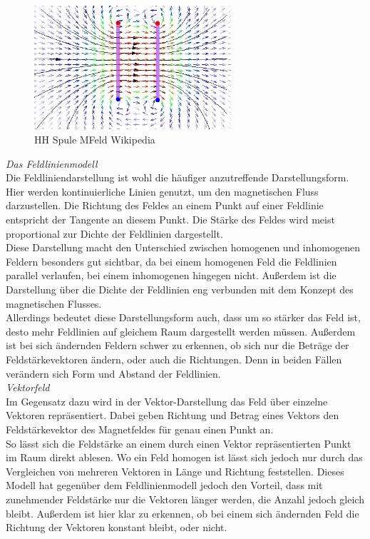 \begin{figure}[h!]
	\centering
	\includegraphics[width=0.65\textwidth]{images/Magnetfeld-Helmholtzspule.jpg}
	\caption{HH Spule MFeld Wikipedia}
	\label{img:Magnetfeld-Helmholtzspule}
\end{figure}

\textit{Das Feldlinienmodell}\\
Die Feldliniendarstellung ist wohl die häufiger anzutreffende Darstellungsform. Hier werden kontinuierliche Linien genutzt, um den magnetischen Fluss darzustellen. Die Richtung des Feldes an einem Punkt auf einer Feldlinie entspricht der Tangente an diesem Punkt.  Die Stärke des Feldes wird meist proportional zur Dichte der Feldlinien dargestellt.\\

Diese Darstellung macht den Unterschied zwischen homogenen und inhomogenen Feldern besonders gut sichtbar, da bei einem homogenen Feld die Feldlinien parallel verlaufen, bei einem inhomogenen hingegen nicht. Außerdem ist die Darstellung über die Dichte der Feldlinien eng verbunden mit dem Konzept des magnetischen Flusses.\\
Allerdings bedeutet diese Darstellungsform auch, dass um so stärker das Feld ist, desto mehr Feldlinien auf gleichem Raum dargestellt werden müssen. Außerdem ist bei sich ändernden Feldern schwer zu erkennen, ob sich nur die Beträge der Feldstärkevektoren ändern, oder auch die Richtungen. Denn in beiden Fällen verändern sich Form und Abstand der Feldlinien.\\

\textit{Vektorfeld}\\
Im Gegensatz dazu wird in der Vektor-Darstellung das Feld über einzelne Vektoren repräsentiert. Dabei geben Richtung und Betrag eines Vektors den Feldstärkevektor des Magnetfeldes für genau einen Punkt an.\\
So lässt sich die Feldstärke an einem durch einen Vektor repräsentierten Punkt im Raum direkt ablesen. Wo ein Feld homogen ist lässt sich jedoch nur durch das Vergleichen von mehreren Vektoren in Länge und Richtung feststellen. Dieses Modell hat gegenüber dem Feldlinienmodell jedoch den Vorteil, dass mit zunehmender Feldstärke nur die Vektoren länger werden, die Anzahl jedoch gleich bleibt. Außerdem ist hier klar zu erkennen, ob bei einem sich ändernden Feld die Richtung der Vektoren konstant bleibt, oder nicht.

